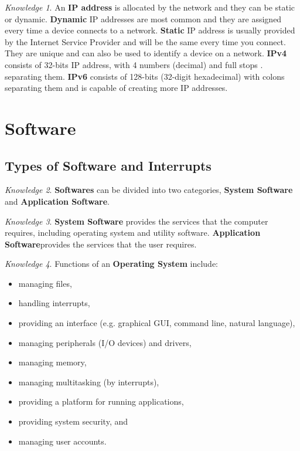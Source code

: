 \documentclass[8pt]{article}
\theoremstyle{remark}
\newtheorem{knowledge}{Knowledge}[subsection]
\begin{document}
            \begin{knowledge}
                An \textbf{IP address} is allocated by the network and they can be static or dynamic. \textbf{Dynamic} IP addresses are most common and they are assigned every time a device connects to a network. \textbf{Static} IP address is usually provided by the Internet Service Provider and will be the same every time you connect. They are unique and can also be used to identify a device on a network. \textbf{IPv4} consists of 32-bits IP address, with 4 numbers (decimal) and full stops . separating them. \textbf{IPv6} consists of 128-bits (32-digit hexadecimal) with colons separating them and is capable of creating more IP addresses.
            \end{knowledge}
    
    \section{Software}

        \subsection{Types of Software and Interrupts}
            \begin{knowledge}
                \textbf{Softwares} can be divided into two categories, \textbf{System Software} and \textbf{Application Software}.
            \end{knowledge}

            \begin{knowledge}
                \textbf{System Software} provides the services that the computer requires, including operating system and utility software. \textbf{Application Software}provides the services that the user requires.
            \end{knowledge}

            \begin{knowledge}
                Functions of an \textbf{Operating System} include:
                \begin{itemize}
                    \item managing files,
                    \item handling interrupts,
                    \item providing an interface (e.g. graphical GUI, command line, natural language),
                    \item managing peripherals (I/O devices) and drivers,
                    \item managing memory,
                    \item managing multitasking (by interrupts),
                    \item providing a platform for running applications,
                    \item providing system security, and
                    \item managing user accounts.
                \end{itemize}
            \end{knowledge}
\end{document}
